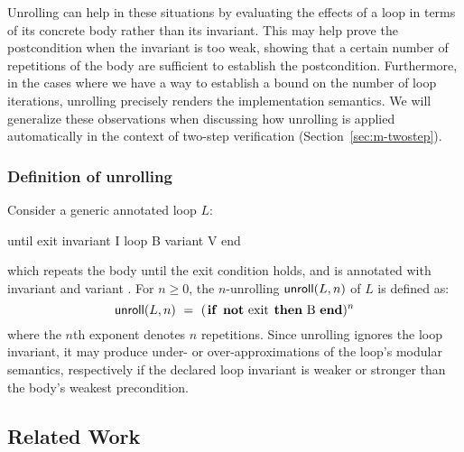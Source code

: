 Unrolling can help in these situations by evaluating the effects of a loop in terms of its concrete body rather than its invariant.
This may help prove the postcondition when the invariant is too weak, showing that a certain number of repetitions of the body are sufficient to establish the postcondition.
Furthermore, in the cases where we have a way to establish a bound on the number of loop iterations, unrolling precisely renders the implementation semantics.
We will generalize these observations when discussing how unrolling is applied automatically in the context of two-step verification (Section~\ref{sec:m-twostep}).


\subsubsection{Definition of unrolling}


Consider a generic annotated loop $L$:
\begin{erunning}
until exit invariant I loop B variant V end
\end{erunning}
which repeats the body  until the exit condition  holds, and is annotated with invariant  and variant .
For $n \geq 0$, the $n$-unrolling $\mathsf{unroll}(L, n)$ of $L$ is defined as:
\[
\unroll(L, n) \ =\                  ( \text{\e{if not exit then B end}} )^n
\]
where the $n$th exponent denotes $n$ repetitions.
Since unrolling ignores the loop invariant, it may produce under- or over-approximations of the loop's modular semantics, respectively if the declared loop invariant is weaker or stronger than the body's weakest precondition.





\subsection{Related Work} \label{sec:m-inlining:related-work}


